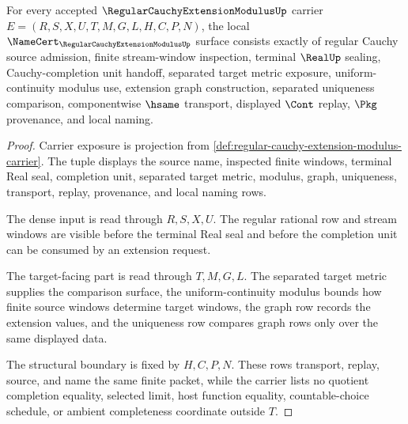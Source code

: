 \begin{theorem}
\label{thm:regular-cauchy-extension-modulus-namecert-obligations}
For every accepted $\RegularCauchyExtensionModulusUp$ carrier $E=(R,S,X,U,T,M,G,L,H,C,P,N)$, the local $\NameCert_{\RegularCauchyExtensionModulusUp}$ surface consists exactly of regular Cauchy source admission, finite stream-window inspection, terminal $\RealUp$ sealing, Cauchy-completion unit handoff, separated target metric exposure, uniform-continuity modulus use, extension graph construction, separated uniqueness comparison, componentwise $\hsame$ transport, displayed $\Cont$ replay, $\Pkg$ provenance, and local naming.
\end{theorem}
\begin{proof}
Carrier exposure is projection from \autoref{def:regular-cauchy-extension-modulus-carrier}. The tuple displays the source name, inspected finite windows, terminal Real seal, completion unit, separated target metric, modulus, graph, uniqueness, transport, replay, provenance, and local naming rows.

The dense input is read through $R,S,X,U$. The regular rational row and stream windows are visible before the terminal Real seal and before the completion unit can be consumed by an extension request.

The target-facing part is read through $T,M,G,L$. The separated target metric supplies the comparison surface, the uniform-continuity modulus bounds how finite source windows determine target windows, the graph row records the extension values, and the uniqueness row compares graph rows only over the same displayed data.

The structural boundary is fixed by $H,C,P,N$. These rows transport, replay, source, and name the same finite packet, while the carrier lists no quotient completion equality, selected limit, host function equality, countable-choice schedule, or ambient completeness coordinate outside $T$.
\end{proof}

